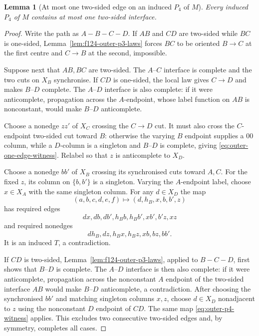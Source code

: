 \documentclass[11pt]{article}
\numberwithin{equation}{section}
\theoremstyle{plain}
\newtheorem{lemma}[theorem]{Lemma}
\theoremstyle{definition}
\begin{document}
\begin{lemma}[At most one two-sided edge on an induced $P_4$ of $M$]
\label{lem:f124-outer-p4-one-two-sided}
Every induced $P_4$ of $M$ contains at most one two-sided interface.
\end{lemma}

\begin{proof}
Write the path as $A-B-C-D$.  If $AB$ and $CD$ are two-sided while $BC$ is
one-sided, Lemma~\ref{lem:f124-outer-p3-laws} forces $BC$ to be oriented
$B\to C$ at the first centre and $C\to B$ at the second, impossible.

Suppose next that $AB,BC$ are two-sided.  The $A$--$C$ interface is complete
and the two cuts on $X_B$ synchronise.  If $CD$ is one-sided, the local
law gives $C\to D$ and makes $B$--$D$ complete.  The $A$--$D$ interface
is also complete: if it were anticomplete, propagation across the
$A$-endpoint, whose label function on $AB$ is nonconstant, would make
$B$--$D$ anticomplete.

Choose a nonedge $zz'$ of $X_C$ crossing the $C\to D$ cut.  It must
also cross the $C$-endpoint two-sided cut toward $B$: otherwise the varying
$B$ endpoint supplies a $00$ column, while a $D$-column is a singleton
and $B$--$D$ is complete, giving
\eqref{eq:outer-one-edge-witness}.  Relabel so that $z$ is
anticomplete to $X_D$.

Choose a nonedge $bb'$ of $X_B$ crossing its synchronised cuts toward
$A,C$.  For the fixed $z$, its column on $\{b,b'\}$ is a singleton.
Varying the $A$-endpoint label, choose $x\in X_A$ with the same
singleton column.  For any $d\in X_D$ the map
\begin{equation}
 (a,b,c,d,e,f)\longmapsto(d,h_B,x,b,b',z)
 \label{eq:outer-p4-witness}
\end{equation}
has required edges
\[
 dx,db,db',h_Bb,h_Bb',xb',b'z,xz
\]
and required nonedges
\[
 dh_B,dz,h_Bx,h_Bz,xb,bz,bb'.
\]
It is an induced $T$, a contradiction.

If $CD$ is two-sided, Lemma~\ref{lem:f124-outer-p3-laws}, applied to
$B-C-D$, first shows that $B$--$D$ is complete.  The $A$--$D$
interface is then also complete: if it were anticomplete, propagation
across the nonconstant $A$ endpoint of the two-sided interface $AB$
would make $B$--$D$ anticomplete, a contradiction.  After choosing the
synchronised $bb'$ and matching singleton columns $x,z$, choose
$d\in X_D$ nonadjacent to $z$ using the nonconstant $D$ endpoint of
$CD$.  The same map \eqref{eq:outer-p4-witness} applies.  This excludes two
consecutive two-sided edges and,
by symmetry, completes all cases.
\end{proof}
\end{document}
